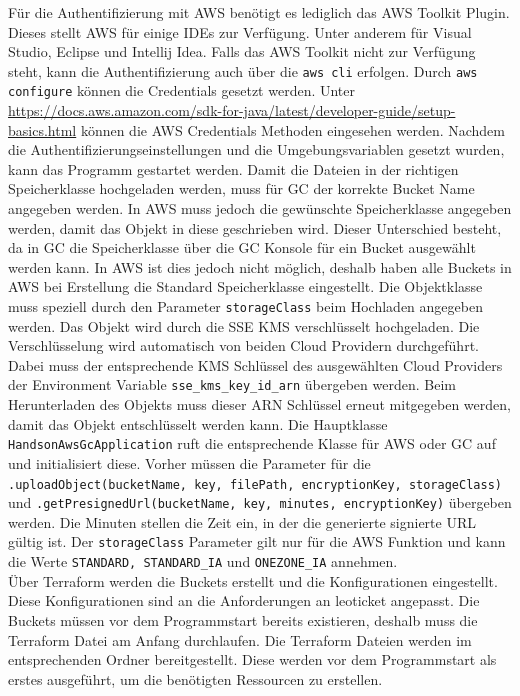 Für die Authentifizierung mit AWS benötigt es lediglich das AWS Toolkit Plugin. Dieses stellt AWS für einige IDEs zur Verfügung. Unter anderem für Visual Studio, Eclipse und Intellij Idea. Falls das AWS Toolkit nicht zur Verfügung steht, kann die Authentifizierung auch über die \verb|aws cli| erfolgen. Durch \verb|aws configure| können die Credentials gesetzt werden. Unter \url{https://docs.aws.amazon.com/sdk-for-java/latest/developer-guide/setup-basics.html} können die AWS Credentials Methoden eingesehen werden. Nachdem die Authentifizierungseinstellungen und die Umgebungsvariablen gesetzt wurden, kann das Programm gestartet werden. Damit die Dateien in der richtigen Speicherklasse hochgeladen werden, muss für GC der korrekte Bucket Name angegeben werden. In AWS muss jedoch die gewünschte Speicherklasse angegeben werden, damit das Objekt in diese geschrieben wird. Dieser Unterschied besteht, da in GC die Speicherklasse über die GC Konsole für ein Bucket ausgewählt werden kann. In AWS ist dies jedoch nicht möglich, deshalb haben alle Buckets in AWS bei Erstellung die Standard Speicherklasse eingestellt. Die Objektklasse muss speziell durch den Parameter \verb|storageClass| beim Hochladen angegeben werden. Das Objekt wird durch die SSE KMS verschlüsselt hochgeladen. Die Verschlüsselung wird automatisch von beiden Cloud Providern durchgeführt. Dabei muss der entsprechende KMS Schlüssel des ausgewählten Cloud Providers der Environment Variable \verb|sse_kms_key_id_arn| übergeben werden. Beim Herunterladen des Objekts muss dieser ARN Schlüssel erneut mitgegeben werden, damit das Objekt entschlüsselt werden kann. Die Hauptklasse \verb|HandsonAwsGcApplication| ruft die entsprechende Klasse für AWS oder GC auf und initialisiert diese. Vorher müssen die Parameter für die \verb|.uploadObject(bucketName, key, filePath, encryptionKey, storageClass)| und \verb|.getPresignedUrl(bucketName, key, minutes, encryptionKey)| übergeben werden. Die Minuten stellen die Zeit ein, in der die generierte signierte URL gültig ist. Der \verb|storageClass| Parameter gilt nur für die AWS Funktion und kann die Werte \verb|STANDARD, STANDARD_IA| und \verb|ONEZONE_IA| annehmen.\\

Über Terraform werden die Buckets erstellt und die Konfigurationen eingestellt. Diese Konfigurationen sind an die Anforderungen an leoticket angepasst. Die Buckets müssen vor dem Programmstart bereits existieren, deshalb muss die Terraform Datei am Anfang durchlaufen. Die Terraform Dateien werden im entsprechenden Ordner bereitgestellt. Diese werden vor dem Programmstart als erstes ausgeführt, um die benötigten Ressourcen zu erstellen.\\

